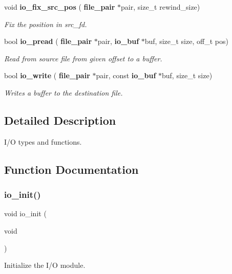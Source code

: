 \begin{DoxyCompactItemize}
void \textbf{ io\+\_\+fix\+\_\+src\+\_\+pos} (\textbf{ file\+\_\+pair} $\ast$pair, size\+\_\+t rewind\+\_\+size)
\begin{DoxyCompactList}\small\item\em Fix the position in src\+\_\+fd. \end{DoxyCompactList}\item 
bool \textbf{ io\+\_\+pread} (\textbf{ file\+\_\+pair} $\ast$pair, \textbf{ io\+\_\+buf} $\ast$buf, size\+\_\+t size, off\+\_\+t pos)
\begin{DoxyCompactList}\small\item\em Read from source file from given offset to a buffer. \end{DoxyCompactList}\item 
bool \textbf{ io\+\_\+write} (\textbf{ file\+\_\+pair} $\ast$pair, const \textbf{ io\+\_\+buf} $\ast$buf, size\+\_\+t size)
\begin{DoxyCompactList}\small\item\em Writes a buffer to the destination file. \end{DoxyCompactList}\end{DoxyCompactItemize}


\subsection{Detailed Description}
I/O types and functions. 



\subsection{Function Documentation}
\mbox{\label{file__io_8h_a43bba613ce0efd6af387cd04458ede8d}} 
\subsubsection{io\+\_\+init()}
{\footnotesize\ttfamily void io\+\_\+init (\begin{DoxyParamCaption}\item[{void}]{ }\end{DoxyParamCaption})}



Initialize the I/O module. 

\mbox{\label{file__io_8h_a3e78657470e4fe9cc6755931b07f9f93}} 
